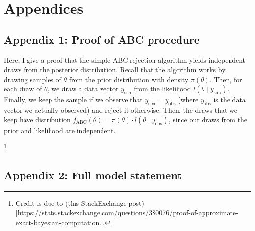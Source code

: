 \documentclass[
]{book}
\begin{document}
\hypertarget{appendices}{%
\chapter{Appendices}\label{appendices}}

\hypertarget{appendix-1-proof-of-abc-procedure}{%
\section{Appendix 1: Proof of ABC procedure}\label{appendix-1-proof-of-abc-procedure}}

Here, I give a proof that the simple ABC rejection algorithm yields independent draws from the posterior distribution. Recall that the algorithm works by drawing samples of \(\theta\) from the prior distribution with density \(\pi (\theta)\). Then, for each draw of \(\theta\), we draw a data vector \(y_{\text {sim}}\) from the likelihood \(l(\theta \mid y_{\text{sim}})\). Finally, we keep the sample if we observe that \(y_{\text{sim}} = y_{\text{obs}}\) (where \(y_{\text{obs}}\) is the data vector we actually observed) and reject it otherwise. Then, the draws that we keep have distribution \(f_{\text{ABC}}(\theta) = \pi(\theta) \cdot l(\theta \mid y_{\text{obs}})\), since our draws from the prior and likelihood are independent.

\footnote{Credit is due to (this StackExchange post){[}\url{https://stats.stackexchange.com/questions/380076/proof-of-approximate-exact-bayesian-computation}.{]}.}

\hypertarget{appendix-2-full-model-statement}{%
\section{Appendix 2: Full model statement}\label{appendix-2-full-model-statement}}
\end{document}
